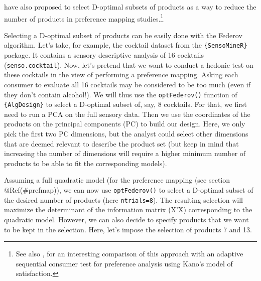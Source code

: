 \documentclass[
]{krantz}
\makeatletter
\newenvironment{Shaded}{\begin{snugshade}}{\end{snugshade}}
\newcommand{\AttributeTok}[1]{\textcolor[rgb]{0.61,0.61,0.61}{#1}}
\newcommand{\ConstantTok}[1]{\textcolor[rgb]{0,0,0}{#1}}
\newcommand{\DecValTok}[1]{\textcolor[rgb]{0.06,0.06,0.06}{#1}}
\newcommand{\FunctionTok}[1]{\textcolor[rgb]{0,0,0}{#1}}
\newcommand{\NormalTok}[1]{#1}
\newcommand{\OtherTok}[1]{\textcolor[rgb]{0.37,0.37,0.37}{#1}}
\newcommand{\SpecialCharTok}[1]{\textcolor[rgb]{0,0,0}{#1}}
\newenvironment{kframe}{%
\medskip{}
\setlength{\fboxsep}{.8em}
 \def\at@end@of@kframe{}%
 \ifinner\ifhmode%
  \def\at@end@of@kframe{\end{minipage}}%
  \begin{minipage}{\columnwidth}%
 \fi\fi%
 \def\FrameCommand##1{\hskip\@totalleftmargin \hskip-\fboxsep
 \colorbox{shadecolor}{##1}\hskip-\fboxsep
     \hskip-\linewidth \hskip-\@totalleftmargin \hskip\columnwidth}%
 \MakeFramed {\advance\hsize-\width
   \@totalleftmargin\z@ \linewidth\hsize
   \@setminipage}}%
 {\par\unskip\endMakeFramed%
 \at@end@of@kframe}
\renewenvironment{Shaded}{\begin{kframe}}{\end{kframe}}
\makeatother
\begin{document}
\citet{benslama1998} have also proposed to select D-optimal subsets of products as a way to reduce the number of products in preference mapping studies.\footnote{See also \citep{riviere2006}, for an interesting comparison of this approach with an adaptive sequential consumer test for preference analysis using Kano's model of satisfaction.}

Selecting a D-optimal subset of products can be easily done with the Federov algorithm. Let's take, for example, the cocktail dataset from the \texttt{\{SensoMineR\}} package. It contains a sensory descriptive analysis of 16 cocktails (\texttt{senso.cocktail}).
Now, let's pretend that we want to conduct a hedonic test on these cocktails in the view of performing a preference mapping. Asking each consumer to evaluate all 16 cocktails may be considered to be too much (even if they don't contain alcohol!). We will thus use the \texttt{optFederov()} function of \texttt{\{AlgDesign\}} to select a D-optimal subset of, say, 8 cocktails. For that, we first need to run a PCA on the full sensory data. Then we use the coordinates of the products on the principal components (PC) to build our design. Here, we only pick the first two PC dimensions, but the analyst could select other dimensions that are deemed relevant to describe the product set (but keep in mind that increasing the number of dimensions will require a higher minimum number of products to be able to fit the corresponding models).

\begin{Shaded}
\end{Shaded}

Assuming a full quadratic model (for the preference mapping (see section @Ref(\#prefmap)), we can now use \texttt{optFederov()} to select a D-optimal subset of the desired number of products (here \texttt{ntrials=8}). The resulting selection will maximize the determinant of the information matrix (X'X) corresponding to the quadratic model. However, we can also decide to specify products that we want to be kept in the selection. Here, let's impose the selection of products 7 and 13.
\end{document}
